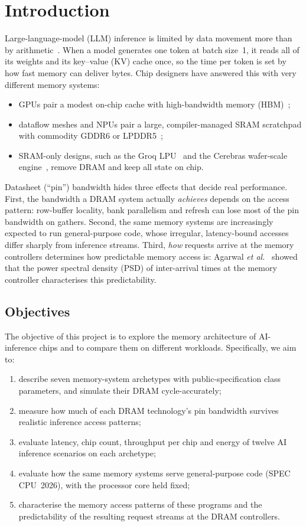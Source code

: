 \documentclass[12pt]{article}
\begin{document}
\section{Introduction}
Large-language-model (LLM) inference is limited by data movement more than by arithmetic~\cite{wulf1995,gholami2024}. When a model generates one token at batch size~1, it reads all of its weights and its key--value (KV) cache once, so the time per token is set by how fast memory can deliver bytes. Chip designers have answered this with very different memory systems:
\begin{itemize}
\item GPUs pair a modest on-chip cache with high-bandwidth memory (HBM)~\cite{choquette2023};
\item dataflow meshes and NPUs pair a large, compiler-managed SRAM scratchpad with commodity GDDR6 or LPDDR5~\cite{vasiljevic2021};
\item SRAM-only designs, such as the Groq LPU~\cite{abts2020} and the Cerebras wafer-scale engine~\cite{lie2023}, remove DRAM and keep all state on chip.
\end{itemize}

Datasheet (``pin'') bandwidth hides three effects that decide real performance. First, the bandwidth a DRAM system actually \emph{achieves} depends on the access pattern: row-buffer locality, bank parallelism and refresh can lose most of the pin bandwidth on gathers. Second, the same memory systems are increasingly expected to run general-purpose code, whose irregular, latency-bound accesses differ sharply from inference streams. Third, \emph{how} requests arrive at the memory controllers determines how predictable memory access is: Agarwal \emph{et al.}~\cite{agarwal2025} showed that the power spectral density (PSD) of inter-arrival times at the memory controller characterises this predictability.

\subsection{Objectives}
The objective of this project is to explore the memory architecture of AI-inference chips and to compare them on different workloads. Specifically, we aim to:
\begin{enumerate}
\item describe seven memory-system archetypes with public-specification class parameters, and simulate their DRAM cycle-accurately;
\item measure how much of each DRAM technology's pin bandwidth survives realistic inference access patterns;
\item evaluate latency, chip count, throughput per chip and energy of twelve AI inference scenarios on each archetype;
\item evaluate how the same memory systems serve general-purpose code (SPEC CPU~2026), with the processor core held fixed;
\item characterise the memory access patterns of these programs and the predictability of the resulting request streams at the DRAM controllers.
\end{enumerate}
\end{document}
